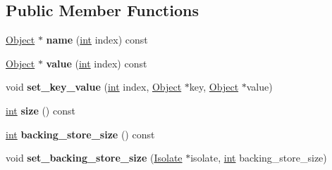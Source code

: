 \subsection*{Public Member Functions}
\begin{DoxyCompactItemize}
\item 
\mbox{\label{classv8_1_1internal_1_1ObjectBoilerplateDescription_a4ebd4cf389064abb62002295117d43e6}} 
\mbox{\hyperlink{classv8_1_1internal_1_1Object}{Object}} $\ast$ {\bfseries name} (\mbox{\hyperlink{classint}{int}} index) const
\item 
\mbox{\label{classv8_1_1internal_1_1ObjectBoilerplateDescription_ad733fd4615852eae165e7a715c412088}} 
\mbox{\hyperlink{classv8_1_1internal_1_1Object}{Object}} $\ast$ {\bfseries value} (\mbox{\hyperlink{classint}{int}} index) const
\item 
\mbox{\label{classv8_1_1internal_1_1ObjectBoilerplateDescription_a880fc564d307cadb80afedfceb5ba6f1}} 
void {\bfseries set\+\_\+key\+\_\+value} (\mbox{\hyperlink{classint}{int}} index, \mbox{\hyperlink{classv8_1_1internal_1_1Object}{Object}} $\ast$key, \mbox{\hyperlink{classv8_1_1internal_1_1Object}{Object}} $\ast$value)
\item 
\mbox{\label{classv8_1_1internal_1_1ObjectBoilerplateDescription_a733349081bf46221cb4dd20a5b4e1b3b}} 
\mbox{\hyperlink{classint}{int}} {\bfseries size} () const
\item 
\mbox{\label{classv8_1_1internal_1_1ObjectBoilerplateDescription_a03d73a52aa66f3a180857de7847ca7c0}} 
\mbox{\hyperlink{classint}{int}} {\bfseries backing\+\_\+store\+\_\+size} () const
\item 
\mbox{\label{classv8_1_1internal_1_1ObjectBoilerplateDescription_a5205d244f82ba8c2c3dfc84396157ab8}} 
void {\bfseries set\+\_\+backing\+\_\+store\+\_\+size} (\mbox{\hyperlink{classv8_1_1internal_1_1Isolate}{Isolate}} $\ast$isolate, \mbox{\hyperlink{classint}{int}} backing\+\_\+store\+\_\+size)
\end{DoxyCompactItemize}
